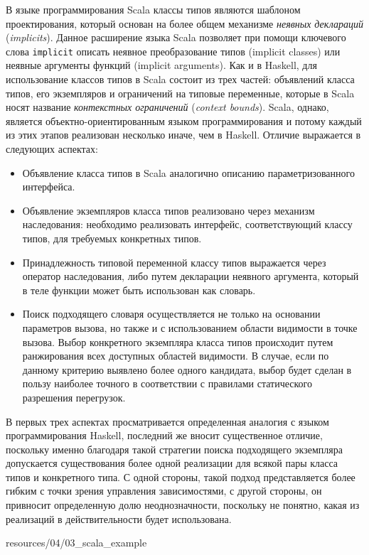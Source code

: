 В языке программирования Scala классы типов являются шаблоном проектирования, который основан на более общем механизме \emph{неявных деклараций} (\emph{implicits}). Данное расширение языка Scala позволяет при помощи ключевого слова \lstinline{implicit} описать неявное преобразование типов (implicit classes) или неявные аргументы функций (implicit arguments). Как и в Haskell, для использование классов типов в Scala состоит из трех частей: объявлений класса типов, его экземпляров и ограничений на типовые переменные, которые в Scala носят название \emph{контекстных ограничений} (\emph{context bounds}). Scala, однако, является объектно-ориентированным языком программирования и потому каждый из этих этапов реализован несколько иначе, чем в Haskell. Отличие выражается в следующих аспектах:
\begin{itemize}
    \item Объявление класса типов в Scala аналогично описанию параметризованного интерфейса. 
    \item Объявление экземпляров класса типов реализовано через механизм наследования: необходимо реализовать интерфейс, соответствующий классу типов, для требуемых конкретных типов. 
    \item Принадлежность типовой переменной классу типов выражается через оператор наследования, либо путем декларации неявного аргумента, который в теле функции может быть использован как словарь.
    \item Поиск подходящего словаря осуществляется не только на основании параметров вызова, но также и с использованием области видимости в точке вызова. Выбор конкретного экземпляра класса типов происходит путем ранжирования всех доступных областей видимости. В случае, если по данному критерию выявлено более одного кандидата, выбор будет сделан в пользу наиболее точного в соответствии с правилами статического разрешения перегрузок.   
\end{itemize}
В первых трех аспектах просматривается определенная аналогия с языком программирования Haskell, последний же вносит существенное отличие, поскольку именно благодаря такой стратегии поиска подходящего экземпляра допускается существования более одной реализации для всякой пары класса типов и конкретного типа. С одной стороны, такой подход представляется более гибким с точки зрения управления зависимостями, с другой стороны, он привносит определенную долю неоднозначности, поскольку не понятно, какая из реализаций в действительности будет использована.   


{resources/04/03_scala_example}


